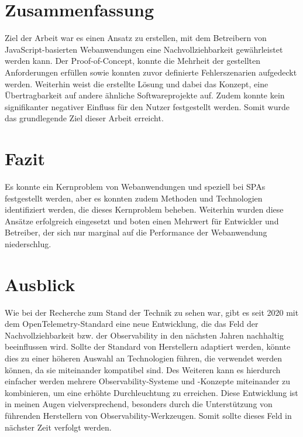 
\section{Zusammenfassung}

Ziel der Arbeit war es einen Ansatz zu erstellen, mit dem Betreibern von JavaScript-basierten Webanwendungen eine Nachvollziehbarkeit gewährleistet werden kann. Der Proof-of-Concept, konnte die Mehrheit der gestellten Anforderungen erfüllen sowie konnten zuvor definierte Fehlerszenarien aufgedeckt werden. Weiterhin weist die erstellte Lösung und dabei das Konzept, eine Übertragbarkeit auf andere ähnliche Softwareprojekte auf. Zudem konnte kein signifikanter negativer Einfluss für den Nutzer festgestellt werden. Somit wurde das grundlegende Ziel dieser Arbeit erreicht.

\section{Fazit}

Es konnte ein Kernproblem von Webanwendungen und speziell bei SPAs festgestellt werden, aber es konnten zudem Methoden und Technologien identifiziert werden, die dieses Kernproblem beheben. Weiterhin wurden diese Ansätze erfolgreich eingesetzt und boten einen Mehrwert für Entwickler und Betreiber, der sich nur marginal auf die Performance der Webanwendung niederschlug.

\section{Ausblick}

Wie bei der Recherche zum Stand der Technik zu sehen war, gibt es seit 2020 mit dem OpenTelemetry-Standard eine neue Entwicklung, die das Feld der Nachvollziehbarkeit bzw. der Observability in den nächsten Jahren nachhaltig beeinflussen wird. Sollte der Standard von Herstellern adaptiert werden, könnte dies zu einer höheren Auswahl an Technologien führen, die verwendet werden können, da sie miteinander kompatibel sind. Des Weiteren kann es hierdurch einfacher werden mehrere Observability-Systeme und -Konzepte miteinander zu kombinieren, um eine erhöhte Durchleuchtung zu erreichen. Diese Entwicklung ist in meinen Augen vielversprechend, besonders durch die Unterstützung von führenden Herstellern von Observability-Werkzeugen. Somit sollte dieses Feld in nächster Zeit verfolgt werden.